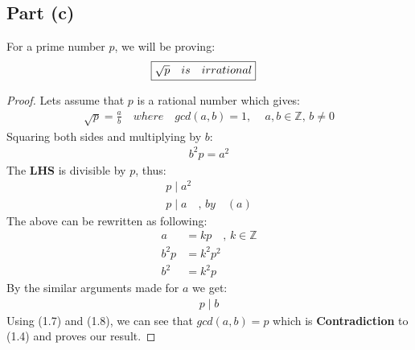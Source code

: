 \documentclass{article}
\begin{document}
{    \subsection{Part (c)}{
      For a prime number $p$, we will be proving:
      \begin{align*}
        \Aboxed{\sqrt{p} \quad is \quad irrational}
      \end{align*}
      \begin{proof}
      Lets assume that $p$ is a rational number which gives:
      \begin{align}
      \sqrt{p}=\frac{a}{b} \quad where \quad gcd(a,b)=1 ,\, \quad a,b \in \mathbb{Z} ,\, b \ne 0 
      \end{align}
      Squaring both sides and multiplying by $b$:
      \begin{align}
        b^2p=a^2 \label{eq:5}
      \end{align}
      The \textbf{LHS} is divisible by $p$, thus:
      \begin{align}
        p \mid a^2 \label{eq:6} \\
        p \mid a \quad,\, by \quad (a) \label{eq:7}
      \end{align}
      The above can be rewritten as following:
      \begin{align*}
        a&=kp \quad,\, k \in \mathbb{Z} \\
        b^2p&=k^2p^2 \\
        b^2&=k^2p
      \end{align*}
      By the similar arguments made for $a$ we get:
      \begin{align}
        p \mid b \label{eq:8}
      \end{align}
      Using (1.7) and (1.8), we can see that $gcd(a,b)=p$ which is \textbf{Contradiction} to (1.4) and proves our result.
      \end{proof} 
    }
}
\end{document}
